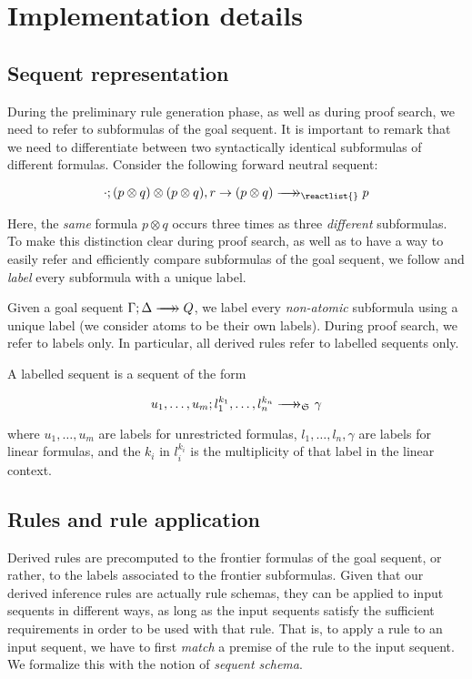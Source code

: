 \section{Implementation details}

\subsection{Sequent representation}

During the preliminary rule generation phase, as well as during proof search, we
need to refer to subformulas of the goal sequent. It is important to remark that
we need to differentiate between two syntactically identical subformulas of
different formulas. Consider the following forward neutral sequent:

\[
  \zfneuseq{\cdot}{(p \otimes q) \otimes (p \otimes q),
    r \rightarrow (p \otimes q)}{\reactlist{}}{p}
\]

Here, the \emph{same} formula $p \otimes q$ occurs three times as three
\emph{different} subformulas. To make this distinction clear during proof
search, as well as to have a way to easily refer and efficiently compare
subformulas of the goal sequent, we follow \cite{chaudhuri-thesis} and
\emph{label} every subformula with a unique label.

Given a goal sequent $\fneuseq{\Gamma}{\Delta}{Q}$, we label every
\emph{non-atomic} subformula using a unique label (we consider atoms to be their
own labels). During proof search, we refer to labels only. In particular, all
derived rules refer to labelled sequents only.

\begin{definition}
  A labelled sequent is a sequent of the form

  \[
    u_1, \dots, u_m ; l_1^{k_1}, \dots, l_n^{k_n} \fneuseqsymb_{\ctrlset{}} \gamma
  \]

  where $u_1, \dots, u_m$ are labels for unrestricted formulas, $l_1, \dots,
  l_n, \gamma$ are labels for linear formulas, and the $k_i$ in $l_i^{k_i}$ is
  the multiplicity of that label in the linear context.
\end{definition}

\subsection{Rules and rule application}

Derived rules are precomputed to the frontier formulas of the goal sequent, or
rather, to the labels associated to the frontier subformulas. Given that our
derived inference rules are actually rule schemas, they can be applied to input
sequents in different ways, as long as the input sequents satisfy the sufficient
requirements in order to be used with that rule. That is, to apply a rule to an
input sequent, we have to first \emph{match} a premise of the rule to the input
sequent. We formalize this with the notion of \emph{sequent schema}.

